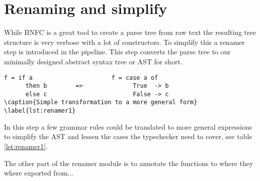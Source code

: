 \section{Renaming and simplify}
While BNFC is a great tool to create a parse tree from raw text the resulting 
tree structure is very verbose with a lot of constructors. To simplify this a
renamer step is introduced in the pipeline. This step converts the parse tree
to our minimally designed abstract syntax tree or AST for short. 

\begin{lstlisting} 
f = if a                      f = case a of
      then b        =>              True  -> b
      else c                        False -> c
\caption{Simple transformation to a more general form}
\label{lst:renamer1}
\end{lstlisting}

In this step a few grammar rules could be translated to more general expressions
to simplify the AST and lessen the cases the typechecker need to cover, see
table \ref{lst:renamer1}.

The other part of the renamer module is to annotate the functions to where they
where exported from...
